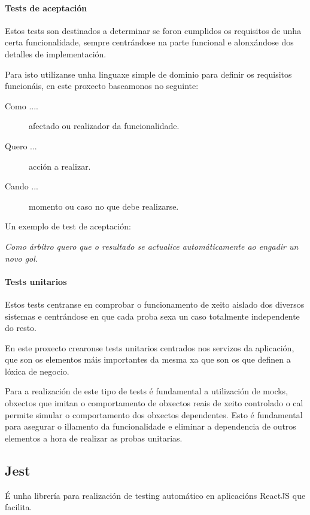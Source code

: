       \paragraph{Tests de aceptación} Estos tests son destinados a determinar 
se foron cumplidos os requisitos de unha certa funcionalidade, sempre 
centrándose na parte funcional e alonxándose dos detalles de implementación.

      Para isto utilízanse unha linguaxe simple de dominio para definir os 
requisitos funcionáis, en este proxecto baseamonos no seguinte:

        \begin{description}
         \item [Como ....] afectado ou realizador da funcionalidade.
         \item [Quero ...] acción a realizar.
         \item [Cando ...] momento ou caso no que debe realizarse.
        \end{description}

        Un exemplo de test de aceptación:

        \emph{Como árbitro quero que o resultado se actualice automáticamente 
ao engadir un novo gol}.

      \paragraph{Tests unitarios} Estos tests centranse en comprobar o 
funcionamento de xeito aislado dos diversos sistemas e centrándose en que cada 
proba sexa un caso totalmente independente do resto.

      En este proxecto crearonse tests unitarios centrados nos servizos da 
aplicación, que son os elementos máis importantes da mesma xa que son os que 
definen a lóxica de negocio.

      Para a realización de este tipo de tests é fundamental a utilización de 
mocks, obxectos que imitan o comportamento de obxectos reais de xeito 
controlado o cal permite simular o comportamento dos obxectos dependentes.
      Esto é fundamental para asegurar o illamento da funcionalidade e eliminar 
a dependencia de outros elementos a hora de realizar as probas unitarias.

    \subsection{Jest}
    É unha librería para realización de testing automático en aplicacións 
ReactJS que facilita.

